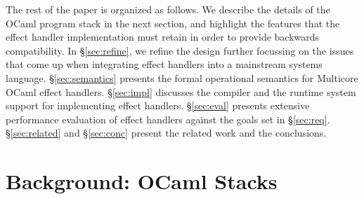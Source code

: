 \documentclass[sigplan,10pt,review,anonymous]{acmart}\settopmatter{printfolios=true,printccs=false,printacmref=false}
\begin{document}
The rest of the paper is organized as follows. We describe the details of the
OCaml program stack in the next section, and highlight the features that the
effect handler implementation must retain in order to provide backwards
compatibility. In \S\ref{sec:refine}, we refine the design further focussing on
the issues that come up when integrating effect handlers into a mainstream
systems language. \S\ref{sec:semantics} presents the formal operational
semantics for Multicore OCaml effect handlers. \S\ref{sec:impl} discusses the
compiler and the runtime system support for implementing effect handlers.
\S\ref{sec:eval} presents extensive performance evaluation of effect handlers
against the goals set in \S\ref{sec:req}. \S\ref{sec:related} and
\S\ref{sec:conc} present the related work and the conclusions.

\section{Background: OCaml Stacks}
\label{sec:stack}
\end{document}
